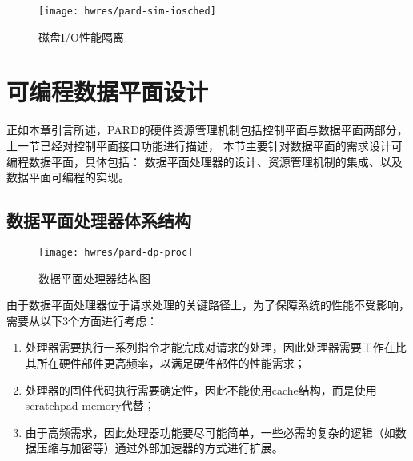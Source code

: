 \begin{figure}[tb]
  \centering
  \texttt{[image: hwres/pard-sim-iosched]}
  \caption{磁盘I/O性能隔离}
  \label{fig:pardsim:iosched}
\end{figure}


\section{可编程数据平面设计}
\label{chap:hwresman:dp}

正如本章引言所述，PARD的硬件资源管理机制包括控制平面与数据平面两部分，
上一节已经对控制平面接口功能进行描述，
本节主要针对数据平面的需求设计可编程数据平面，具体包括：
数据平面处理器的设计、资源管理机制的集成、以及数据平面可编程的实现。

%
%
%
%

\subsection{数据平面处理器体系结构}

\begin{figure}[tb]
  \centering
  \texttt{[image: hwres/pard-dp-proc]}
  \caption{数据平面处理器结构图}
  \label{fig:pard-dp-proc}
\end{figure}

由于数据平面处理器位于请求处理的关键路径上，为了保障系统的性能不受影响，需要从以下3个方面进行考虑：

\begin{enumerate}[leftmargin=2\parindent, nolistsep, label=\arabic*）]
  \item 处理器需要执行一系列指令才能完成对请求的处理，因此处理器需要工作在比其所在硬件部件更高频率，以满足硬件部件的性能需求；
  \item 处理器的固件代码执行需要确定性，因此不能使用cache结构，而是使用scratchpad memory代替；
  \item 由于高频需求，因此处理器功能要尽可能简单，一些必需的复杂的逻辑（如数据压缩与加密等）通过外部加速器的方式进行扩展。
\end{enumerate}

